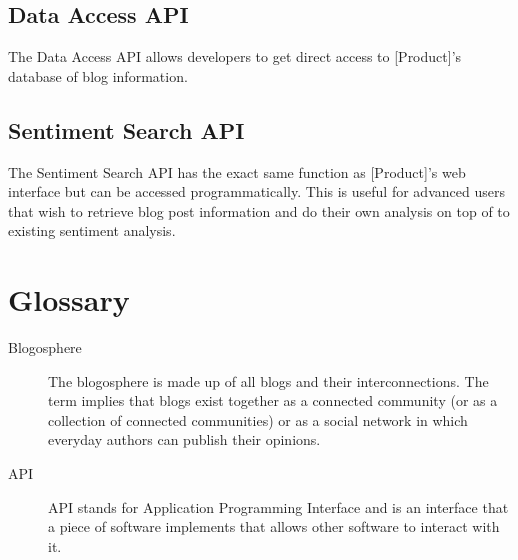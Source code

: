 \documentclass[titlepage]{article}
\begin{document}
\subsection{Data Access API}
The Data Access API allows developers to get direct access to [Product]'s
database of blog information.

\subsection{Sentiment Search API}
The Sentiment Search API has the exact same function as [Product]'s web
interface but can be accessed programmatically.  This is useful for advanced
users that wish to retrieve blog post information and do their own analysis on
top of to existing sentiment analysis.

\section{Glossary}
\begin{description}
\item[Blogosphere] 
The blogosphere is made up of all blogs and their interconnections. The term
implies that blogs exist together as a connected community (or as a collection
of connected communities) or as a social network in which everyday authors can
publish their opinions.
\item[API]
API stands for Application Programming Interface and is an interface that a
piece of software implements that allows other software to interact with it.
\end{description}
\end{document}
